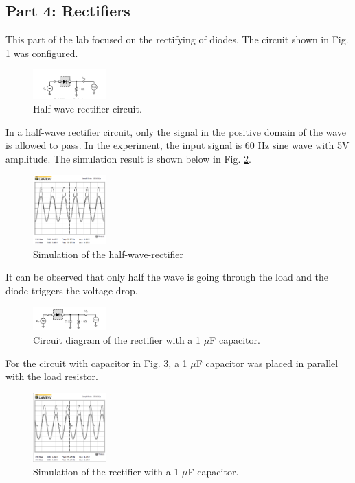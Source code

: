 \documentclass[letterpaper, 10 pt, conference]{ieeeconf}  %
\begin{document}
\subsection{Part 4: Rectifiers}
This part of the lab focused on the rectifying of diodes. The circuit
shown in Fig. \ref{fig:rectifier_1} was configured.
\begin{figure}[h]
  \centering
  \includegraphics[width=0.25\textwidth]{images/rectifier_circuit.png}
  \caption{Half-wave rectifier circuit.}
  \label{fig:rectifier_1}
\end{figure}
\par In a half-wave rectifier circuit, only the signal in the positive domain of
the wave is allowed to pass. In the experiment, the input signal is 60 Hz sine wave
with 5V amplitude. The simulation result is shown below in Fig. \ref{fig:rectifier_2}.
\begin{figure}[h]
  \centering
  \includegraphics[width=0.25\textwidth]{images/halfwave.png}
  \caption{Simulation of the half-wave-rectifier}
  \label{fig:rectifier_2}
\end{figure}
\par It can be observed that only half the wave is going through the load and the diode
triggers the voltage drop.
\begin{figure}[h]
  \centering
  \includegraphics[width=0.25\textwidth]{images/rectifier_circuit_2.png}
  \caption{Circuit diagram of the rectifier with a 1 $\mu$F capacitor.}
  \label{fig:rectifier_3}
\end{figure}
\par For the circuit with capacitor in Fig. \ref{fig:rectifier_3}, a 1 $\mu$F
capacitor was placed in parallel with the load resistor.
\begin{figure}[h]
  \centering
  \includegraphics[width=0.25\textwidth]{images/halfwave_1miuf.png}
  \caption{Simulation of the rectifier with a 1 $\mu$F capacitor.}
  \label{fig:rectifier_4}
\end{figure}
\end{document}
